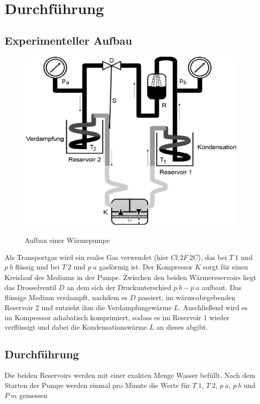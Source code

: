 
\section{Durchführung}
\label{sec:Durchführung}
\subsection{Experimenteller Aufbau}
\begin{figure}
\caption{Aufbau einer Wärmepumpe\cite{V206}}
\includegraphics[scale=0.5]{content/images/aufbau.eps}
\label{fig:abb1}
\end{figure}
\noindent Als Transportgas wird ein reales Gas verwendet (hier $Cl_.{2}F_.{2}C$), das bei $T_.{1}$ und $p_.{b}$ flüssig und bei $T_.{2}$ und $p_.{a}$ gasförmig ist.
Der Kompressor $K$ sorgt für einen Kreislauf des Mediums in der Pumpe.\newline
Zwischen den beiden Wärmereservoirs liegt das Drosselventil $D$
an dem sich der Druckunterschied $p_.{b}-p_.{a}$ aufbaut.\newline
Das flüssige Medium verdampft, nachdem es $D$ passiert, im wärmeabegebenden Reservoir 2 und entzieht ihm die Verdampfungswärme $L$.
Anschließend wird es im Kompressor adiabatisch komprimiert, sodass es im Reservoir 1 wieder verflüssigt und dabei die Kondensationswärme $L$ an dieses abgibt.
\subsection{Durchführung}
Die beiden Reservoirs werden mit einer exakten Menge Wasser befüllt.\newline
Nach dem Starten der Pumpe werden einmal pro Minute die Werte für $T_.{1}$, $T_.{2}$, $p_.{a}$, $p_.{b}$ und $P_.{m}$ gemessen